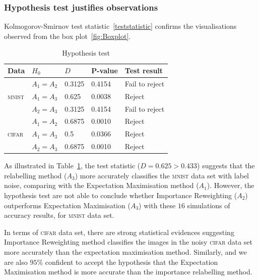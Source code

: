 \documentclass[12pt]{article} %
\begin{document}
\subsubsection{Hypothesis test justifies observations}
Kolmogorov-Smirnov test statistic~\eqref{teststatistic} confirms the visualisations observed from the box plot~\ref{fig:Boxplot}.
\begin{table}%
\centering
 	\caption{Hypothesis test}   
	\begin{tabular}{lllll}
\toprule
Data & $H_0$ & $D$ & P-value & Test result\\
\midrule
 & $A_1= A_2$  &0.3125 & 0.4154 & Fail to reject\\
 
 \textsc{mnist} & $A_1= A_3$ & 0.625 & 0.0038 & Reject\\
 
  & $A_2= A_3$ & 0.3125 & 0.4154 & Fail to reject\\
\midrule
   & $A_1= A_2$ & 0.6875 & 0.0010 & Reject\\

 \textsc{cifar}  & $A_1= A_3$ & 0.5 & 0.0366 & Reject\\

  &  $A_2=A_3$  & 0.6875 & 0.0010 & Reject\\
\bottomrule
\end{tabular} 

	\label{tab:HypothesisTest}
\end{table}
As illustrated in  Table~\ref{tab:HypothesisTest}, the test statistic ($D=0.625>0.433$) suggests that the relabelling method ($A_3$) more accurately classifies the \textsc{mnist} data set with label noise, comparing with the Expectation Maximisation method ($A_1$). 
However, the hypothesis test are not able to conclude whether Importance Reweighting ($A_2$) outperforms Expectation Maximisation ($A_3$) with these $16$ simulations of accuracy results, for \textsc{mnist} data set.

In terms of \textsc{cifar} data set, there are strong statistical evidences suggesting Importance Reweighting method classifies the images in the noisy \textsc{cifar} data set more accurately than the expectation maximisation method. Similarly, and we are also $95\%$ confident to accept the hypothesis that the Expectation Maximisation method is more accurate than the importance relabelling method. 
\end{document}
